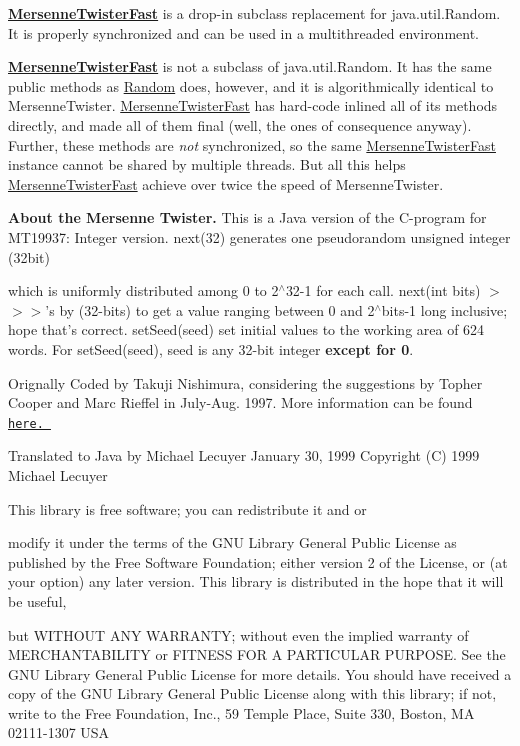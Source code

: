 {\bfseries \hyperlink{classjenes_1_1utils_1_1_mersenne_twister_fast}{Mersenne\-Twister\-Fast}} is a drop-\/in subclass replacement for java.\-util.\-Random. It is properly synchronized and can be used in a multithreaded environment.

{\bfseries \hyperlink{classjenes_1_1utils_1_1_mersenne_twister_fast}{Mersenne\-Twister\-Fast}} is not a subclass of java.\-util.\-Random. It has the same public methods as \hyperlink{classjenes_1_1utils_1_1_random}{Random} does, however, and it is algorithmically identical to Mersenne\-Twister. \hyperlink{classjenes_1_1utils_1_1_mersenne_twister_fast}{Mersenne\-Twister\-Fast} has hard-\/code inlined all of its methods directly, and made all of them final (well, the ones of consequence anyway). Further, these methods are {\itshape not} synchronized, so the same \hyperlink{classjenes_1_1utils_1_1_mersenne_twister_fast}{Mersenne\-Twister\-Fast} instance cannot be shared by multiple threads. But all this helps \hyperlink{classjenes_1_1utils_1_1_mersenne_twister_fast}{Mersenne\-Twister\-Fast} achieve over twice the speed of Mersenne\-Twister.

{\bfseries About the Mersenne Twister. } This is a Java version of the C-\/program for M\-T19937\-: Integer version. next(32) generates one pseudorandom unsigned integer (32bit)

which is uniformly distributed among 0 to 2$^\wedge$32-\/1 for each call. next(int bits) $>$$>$$>$'s by (32-\/bits) to get a value ranging between 0 and 2$^\wedge$bits-\/1 long inclusive; hope that's correct. set\-Seed(seed) set initial values to the working area of 624 words. For set\-Seed(seed), seed is any 32-\/bit integer {\bfseries except for 0}.

Orignally Coded by Takuji Nishimura, considering the suggestions by Topher Cooper and Marc Rieffel in July-\/\-Aug. 1997. More information can be found \href{http://www.math.keio.ac.jp/matumoto/emt.html}{\tt here. }

Translated to Java by Michael Lecuyer January 30, 1999 Copyright (C) 1999 Michael Lecuyer 

This library is free software; you can redistribute it and or

modify it under the terms of the G\-N\-U Library General Public License as published by the Free Software Foundation; either version 2 of the License, or (at your option) any later version. This library is distributed in the hope that it will be useful,

but W\-I\-T\-H\-O\-U\-T A\-N\-Y W\-A\-R\-R\-A\-N\-T\-Y; without even the implied warranty of M\-E\-R\-C\-H\-A\-N\-T\-A\-B\-I\-L\-I\-T\-Y or F\-I\-T\-N\-E\-S\-S F\-O\-R A P\-A\-R\-T\-I\-C\-U\-L\-A\-R P\-U\-R\-P\-O\-S\-E. See the G\-N\-U Library General Public License for more details. You should have received a copy of the G\-N\-U Library General Public License along with this library; if not, write to the Free Foundation, Inc., 59 Temple Place, Suite 330, Boston, M\-A 02111-\/1307 U\-S\-A 

